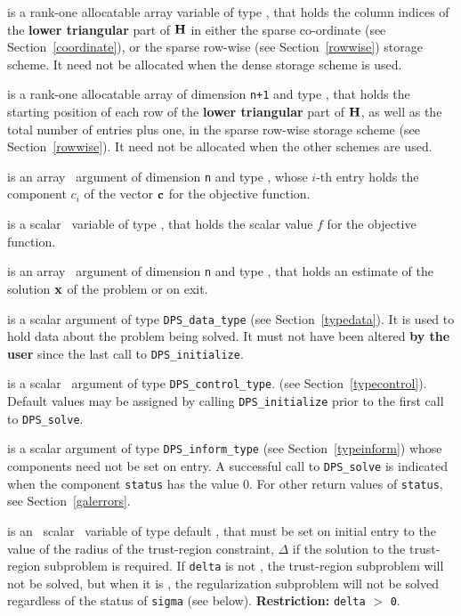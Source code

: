 \documentclass{galahad}
\newcommand{\packagename}{DPS}
\begin{document}
\begin{description}
\begin{description}
 is a rank-one allocatable array variable of type \integer,
that holds the column indices of the {\bf lower triangular} part of
${\mathbf{H}}$ in either the sparse co-ordinate
(see Section~\ref{coordinate}), or the sparse row-wise
(see Section~\ref{rowwise}) storage scheme.
It need not be allocated when the dense
storage scheme is used.

 is a rank-one allocatable array of dimension {\tt n+1} and type
\integer, that holds the starting position of
each row of the {\bf lower triangular} part of ${\mathbf{H}}$, as well
as the total number of entries plus one, in the sparse row-wise storage
scheme (see Section~\ref{rowwise}). It need not be allocated when the
other schemes are used.
\end{description}

 is an array \intentin\ argument of dimension {\tt n} and
type \realdp,  whose $i$-th entry holds the component $c_i$ of
the vector ${\mathbf{c}}$ for the objective function.

 is a scalar \intentin\ variable of type \realdp, that holds
the scalar value $f$ for the objective function.

 is an array \intentout\ argument of dimension {\tt n} and
type \realdp, that holds an estimate of the solution ${\mathbf{x}}$
of the problem  or  on exit.

 is a scalar \intentinout argument of type
{\tt \packagename\_data\_type}
(see Section~\ref{typedata}). It is used to hold data about the problem being
solved. It must not have been altered {\bf by the user} since the last call to
{\tt \packagename\_initialize}.

 is a scalar \intentin\ argument of type
{\tt \packagename\_control\_type}.
(see Section~\ref{typecontrol}).
Default values may be assigned by calling {\tt \packagename\_initialize}
prior to the first call to {\tt \packagename\_solve}.

 is a scalar \intentinout argument of type
{\tt \packagename\_inform\_type}
(see Section~\ref{typeinform}) whose components need not be set on entry.
A successful call to
{\tt \packagename\_solve}
is indicated when the  component {\tt status} has the value 0.
For other return values of {\tt status}, see Section~\ref{galerrors}.

 is an \optional\ scalar \intentin\ variable of type default
\realdp, that must be set on initial entry
to the value of the radius of the trust-region constraint, $\Delta$
if the solution to the trust-region subproblem  is required.
If {\tt delta} is not \present, the trust-region subproblem will not be
solved, but when it is \present, the regularization subproblem will not be
solved regardless of the status of {\tt sigma} (see below).
{\bf Restriction: } {\tt delta} $>$ {\tt 0}.


\end{description}
\end{document}
